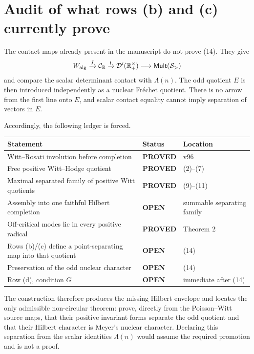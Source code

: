 \documentclass[11pt]{article}
\newcommand{\PROVED}{\textcolor{green!40!black}{\textbf{PROVED}}}
\newcommand{\OPEN}{\textcolor{red!70!black}{\textbf{OPEN}}}
\begin{document}
\section{Audit of what rows (b) and (c) currently prove}

The contact maps already present in the manuscript do not prove (14).
They give
\[
 W_{\rm alg}\xrightarrow{J}\mathcal C_{\mathbb R}
 \xrightarrow{\mathfrak j}\mathcal D'(\mathbb R_+^\times)
 \longrightarrow\mathsf{Mult}(\mathcal S_>)
\]
and compare the scalar determinant contact with $\Lambda(n)$.  The odd
quotient $E$ is then introduced independently as a nuclear Fr\'echet
quotient.  There is no arrow from the first line onto $E$, and scalar
contact equality cannot imply separation of vectors in $E$.

Accordingly, the following ledger is forced.

\begin{center}
\begin{tabular}{>{\raggedright\arraybackslash}p{.53\linewidth}
                >{\centering\arraybackslash}p{.15\linewidth}
                >{\raggedright\arraybackslash}p{.22\linewidth}}
\toprule
Statement & Status & Location \\
\midrule
Witt--Rosati involution before completion & \PROVED & v96 \\
Free positive Witt--Hodge quotient & \PROVED & (2)--(7) \\
Maximal separated family of positive Witt quotients & \PROVED & (9)--(11) \\
Assembly into one faithful Hilbert completion & \OPEN & summable separating family \\
Off-critical modes lie in every positive radical & \PROVED & Theorem 2 \\
Rows (b)/(c) define a point-separating map into that quotient & \OPEN & (14) \\
Preservation of the odd nuclear character & \OPEN & (14) \\
Row (d), condition $G$ & \OPEN & immediate after (14) \\
\bottomrule
\end{tabular}
\end{center}

The construction therefore produces the missing Hilbert envelope and
locates the only admissible non-circular theorem: prove, directly from the
Poisson--Witt source maps, that their positive invariant forms separate the
odd quotient and that their Hilbert character is Meyer's nuclear character.
Declaring this separation from the scalar identities $\Lambda(n)$ would
assume the required promotion and is not a proof.
\end{document}
